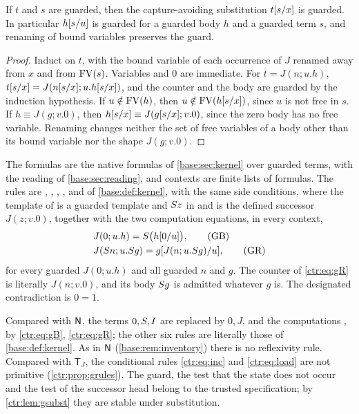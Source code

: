 \begin{lemma}\label{ctr:lem:gsubst}
If $t$ and $s$ are guarded, then the capture-avoiding substitution $t[s/x]$ is
guarded. In particular $h[s/u]$ is guarded for a guarded body $h$ and a guarded term
$s$, and renaming of bound variables preserves the guard.
\end{lemma}
\begin{proof}
Induct on $t$, with the bound variable of each occurrence of $J$ renamed away from $x$ and
from $\operatorname{FV}(s)$. Variables and $0$ are immediate. For $t=J(n;u.h)$,
$t[s/x]=J(n[s/x];u.h[s/x])$, and the counter and the body are guarded
by the induction hypothesis. If $u\notin\operatorname{FV}(h)$, then $u\notin\operatorname{FV}(h[s/x])$, since $u$
is not free in $s$. If $h\equiv J(g;v.0)$, then $h[s/x]\equiv J(g[s/x];v.0)$,
since the zero body has no free variable. Renaming changes neither the set of free variables
of a body other than its bound variable nor the shape $J(g;v.0)$.
\end{proof}

\begin{definition}\label{ctr:def:gcalc}
The formulas are the native formulas of \cref{base:sec:kernel} over guarded terms, with the
reading of \cref{base:sec:reading}, and contexts are finite lists of formulas. The rules are
, , , ,  and 
of \cref{base:def:kernel}, with the same side conditions, where the template of
 is a guarded template and $S z$ in  and  is the
defined successor $J(z;v.0)$, together with the two computation equations, in every
context,
\begin{align}
 & J(0;u.h)=S\bigl(h[0/u]\bigr), \tag{GB}\label{ctr:eq:gB}\\
 & J(S n;u.S g)=g[J(n;u.S g)/u], \tag{GR}\label{ctr:eq:gR}
\end{align}
for every guarded $J(0;u.h)$ and all guarded $n$ and $g$. The counter of \eqref{ctr:eq:gR}
is literally $J(n;v.0)$, and its body $S g$ is admitted whatever $g$ is. The designated
contradiction is $0=1$.
\end{definition}

Compared with $\mathsf{N}$, the terms $0,S,I$ are replaced by $0,J$, and the computations
,  by \eqref{ctr:eq:gB}, \eqref{ctr:eq:gR}; the other six rules are
literally those of \cref{base:def:kernel}. As in $\mathsf{N}$ (\cref{base:rem:inventory}) there is
no reflexivity rule. Compared with $\mathsf T_J$, the conditional rules \eqref{ctr:eq:inc}
and \eqref{ctr:eq:load} are not primitive (\cref{ctr:prop:grules}). The guard, the test
that the state does not occur and the test of the successor head belong to the trusted
specification; by \cref{ctr:lem:gsubst} they are stable under substitution.

